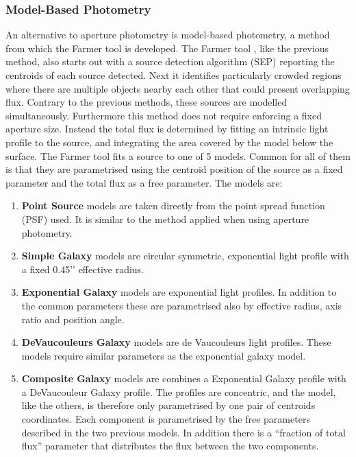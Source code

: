 \subsubsection{Model-Based Photometry}
An alternative to aperture photometry is model-based photometry, a method from which the Farmer tool is developed. The Farmer tool \cite{Weaver_2020}, like the previous method, also starts out with a source detection algorithm (SEP) reporting the centroids of each source detected. Next it identifies particularly crowded regions where there are multiple objects nearby each other that could present overlapping flux. Contrary to the previous methods, these sources are modelled simultaneously. Furthermore this method does not require enforcing a fixed aperture size. Instead the total flux is determined by fitting an intrinsic light profile to the source, and integrating the area covered by the model below the surface. The Farmer tool fits a source to one of 5 models. Common for all of them is that they are parametrised using the centroid position of the source as a fixed parameter and the total flux as a free parameter. The models are:
\begin{enumerate}
    \item \textbf{Point Source} models are taken directly from the point spread function (PSF) used. It is similar to the method applied when using aperture photometry.
    \item \textbf{Simple Galaxy} models are circular symmetric, exponential light profile with a fixed 0.45’’ effective radius.
    \item \textbf{Exponential Galaxy} models are exponential light profiles. In addition to the common parameters these are parametrised also by effective radius, axis ratio and position angle.
    \item \textbf{DeVaucouleurs Galaxy} models are de Vaucouleurs light profiles. These models require similar parameters as the exponential galaxy model.
    \item \textbf{Composite Galaxy} models are combines a Exponential Galaxy profile with a DeVaucouleur Galaxy profile. The profiles are concentric, and the model, like the others, is therefore only parametrised by one pair of centroids coordinates. Each component is parametrised by the free parameters described in the two previous models. In addition there is a “fraction of total flux” parameter that distributes the flux between the two components.
\end{enumerate}

